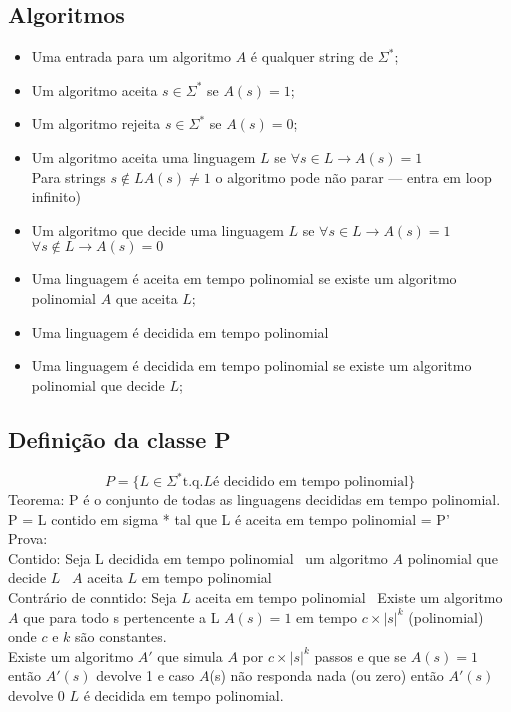 \documentclass[a4paper,oneside,article,table]{article}
\begin{document}
\subsection{Algoritmos}
\begin{itemize}
    \item Uma entrada para um algoritmo $A$ é qualquer string de $\Sigma^*$;
    \item Um algoritmo aceita $s\in\Sigma^*$ se $A(s)=1$;
    \item Um algoritmo rejeita $s\in\Sigma^*$ se $A(s)=0$;
    \item Um algoritmo aceita uma linguagem $L$ se $\forall s \in L \rightarrow A(s)=1$\\
        Para strings $s \notin L A(s) \neq 1$ o algoritmo pode não parar --- entra em loop infinito)\\
    \item Um algoritmo que decide uma linguagem $L$ se $\forall s \in L \rightarrow A(s) = 1$\\
        $\forall s \notin L \rightarrow A(s) = 0$
    \item Uma linguagem é aceita em tempo polinomial se existe um algoritmo polinomial $A$ que aceita $L$;\\\item Uma linguagem é decidida em tempo polinomial 
    \item Uma linguagem é decidida em tempo polinomial se existe um algoritmo polinomial que decide $L$;

\end{itemize}

    \subsection{Definição da classe P}

        \[P = \{ L \in \Sigma^* \textrm{t.q.} L \textrm{é decidido em tempo polinomial} \}\]
        Teorema: P é o conjunto de todas as linguagens decididas em tempo polinomial.\\
        P = {L contido em sigma * tal que L é aceita em tempo polinomial} = P'\\
        Prova:\\
        Contido: Seja L decidida em tempo polinomial \rightarrow~um algoritmo $A$ polinomial que decide $L$ \rightarrow~$A$ aceita $L$ em tempo polinomial\\
        Contrário de conntido: Seja $L$ aceita em tempo polinomial \arrowright~Existe um algoritmo $A$ que para todo s pertencente a L $A(s) = 1$ em tempo $c\times|s|^k$ (polinomial) onde $c$ e $k$ são constantes.\\
        Existe um algoritmo $A'$ que simula $A$ por $c\times|s|^k$ passos e que se $A(s)=1$ então $A'(s)$ devolve 1 e caso $A$(s) não responda nada (ou zero) então $A'(s)$ devolve $0$ \rightarrow $L$ é decidida em tempo polinomial.
\end{document}
